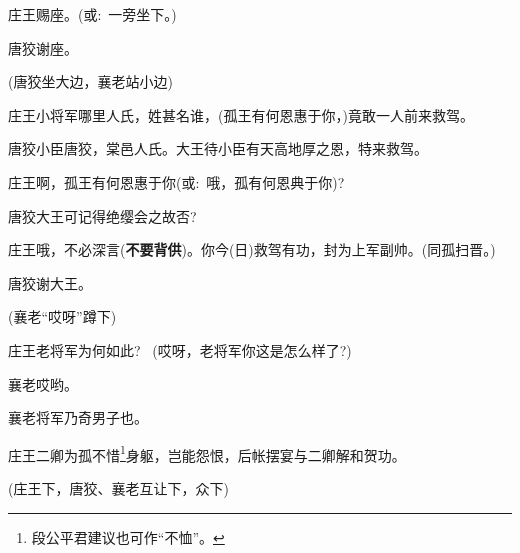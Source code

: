 {庄王\hspace{30pt}赐座。({\akai 或}:~一旁坐下。)

唐狡\hspace{30pt}谢座。

(唐狡{\hwfs 坐大边}，襄老{\hwfs 站小边})

庄王\hspace{30pt}小将军哪里人氏，姓甚名谁，(孤王有何恩惠于你，)竟敢一人前来救驾。

唐狡\hspace{30pt}小臣唐狡，棠邑人氏。大王待小臣有天高地厚之恩，特来救驾。

庄王\hspace{30pt}啊，孤王有何恩惠于你({\akai 或}:~哦，孤有何恩典于你)?

唐狡\hspace{30pt}大王可记得绝缨会之故否?

庄王\hspace{30pt}哦，不必深言({\bfseries\hwfs 不要背供})。你今(日)救驾有功，封为上军副帅。(同孤扫晋。)

唐狡\hspace{30pt}谢大王。

(襄老``哎呀''{\hwfs 蹲下})

庄王\hspace{30pt}老将军为何如此? ~(哎呀，老将军你这是怎么样了?)



襄老\hspace{30pt}哎哟。


襄老\hspace{30pt}将军乃奇男子也。

庄王\hspace{30pt}二卿为孤不惜\footnote{ 段公平君建议也可作``不恤''。}身躯，岂能怨恨，后帐摆宴与二卿解和贺功。

(庄王{\hwfs 下}，唐狡、襄老{\hwfs 互让下}，众{\hwfs 下})
}
